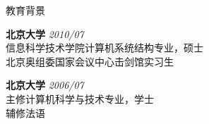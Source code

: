 \documentclass{resume} %
\begin{document}

\begin{rSection}{教育背景}

{\bf 北京大学} \hfill {\em 2010/07} \\ 
信息科学技术学院计算机系统结构专业，硕士 \\
北京奥组委国家会议中心击剑馆实习生

{\bf 北京大学} \hfill {\em 2006/07} \\ 
主修计算机科学与技术专业，学士 \\
辅修法语

\end{rSection}






\end{document}
